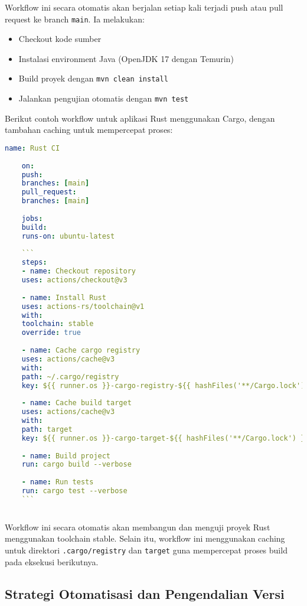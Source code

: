 Workflow ini secara otomatis akan berjalan setiap kali terjadi push atau pull request ke branch \texttt{main}. Ia melakukan:
\begin{itemize}
	\item Checkout kode sumber
	\item Instalasi environment Java (OpenJDK 17 dengan Temurin)
	\item Build proyek dengan \texttt{mvn clean install}
	\item Jalankan pengujian otomatis dengan \texttt{mvn test}
\end{itemize}

Berikut contoh workflow untuk aplikasi Rust menggunakan Cargo, dengan tambahan caching untuk mempercepat proses:

\begin{lstlisting}[language=yaml, caption={Contoh Workflow CI/CD Rust dengan GitHub Actions}]
	name: Rust CI
	
	on:
	push:
	branches: [main]
	pull_request:
	branches: [main]
	
	jobs:
	build:
	runs-on: ubuntu-latest
	
	```
	steps:
	- name: Checkout repository
	uses: actions/checkout@v3
	
	- name: Install Rust
	uses: actions-rs/toolchain@v1
	with:
	toolchain: stable
	override: true
	
	- name: Cache cargo registry
	uses: actions/cache@v3
	with:
	path: ~/.cargo/registry
	key: ${{ runner.os }}-cargo-registry-${{ hashFiles('**/Cargo.lock') }}
	
	- name: Cache build target
	uses: actions/cache@v3
	with:
	path: target
	key: ${{ runner.os }}-cargo-target-${{ hashFiles('**/Cargo.lock') }}
	
	- name: Build project
	run: cargo build --verbose
	
	- name: Run tests
	run: cargo test --verbose
	```
	
\end{lstlisting}

Workflow ini secara otomatis akan membangun dan menguji proyek Rust menggunakan toolchain stable. Selain itu, workflow ini menggunakan caching untuk direktori \texttt{.cargo/registry} dan \texttt{target} guna mempercepat proses build pada eksekusi berikutnya.

\subsection{Strategi Otomatisasi dan Pengendalian Versi}


